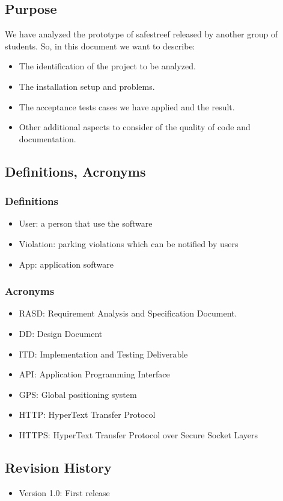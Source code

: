 
\subsection{Purpose}
We have analyzed the prototype of safestreef released by another group of students. So, in this document we want to describe:
\begin{itemize}
\item	The identification of the project to be analyzed.
\item	The installation setup and problems.
\item	The acceptance tests cases we have applied and the result. 
\item	Other additional aspects to consider of the quality of code and documentation.
\end{itemize}

\subsection{Definitions, Acronyms}
\subsubsection {Definitions}
\begin{itemize}
\item     User: a person that use the software
\item	Violation: parking violations which can be notified by users
\item	App: application software 
\end{itemize}
	\subsubsection {Acronyms}
\begin{itemize}
\item	RASD: Requirement Analysis and Specification Document.
\item      DD: Design Document
\item      ITD: Implementation and Testing Deliverable
\item	API: Application Programming Interface
\item	GPS: Global positioning system
\item	HTTP: HyperText Transfer Protocol
\item	HTTPS: HyperText Transfer Protocol over Secure Socket Layers

\end{itemize}
\subsection {Revision History}
\begin{itemize}
\item	Version 1.0: First release
\end{itemize}
